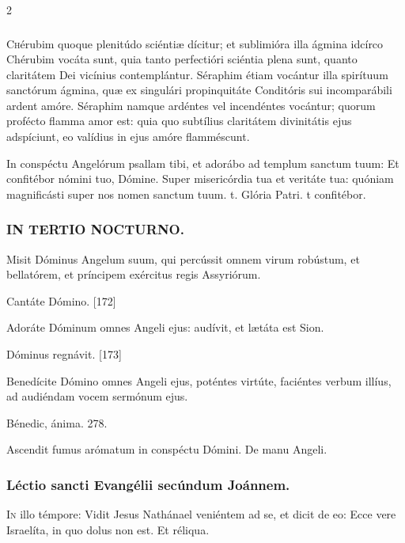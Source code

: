 \documentclass[9pt,twoside]{extarticle}
\begin{document}
\begin{multicols}{2}
\subsubsection*{\center {}}
\lettrine{C}hérubim quoque plenitúdo sciéntiæ dícitur; et sublimióra illa ágmina idcírco Chérubim vocáta sunt, quia tanto perfectióri sciéntia plena sunt, quanto claritátem Dei vicínius contemplántur. Séraphim étiam vocántur illa spirítuum sanctórum ágmina, quæ ex singulári propinquitáte Conditóris sui incomparábili ardent amóre. Séraphim namque ardéntes vel incendéntes vocántur; quorum profécto flamma amor est: quia quo subtílius claritátem divinitátis ejus adspíciunt, eo valídius in ejus amóre flamméscunt.

\begin{tightlist}{}
\item {} In conspéctu Angelórum psallam tibi, et adorábo ad templum sanctum tuum: \textred{*} Et confitébor nómini tuo, Dómine.  Super misericórdia tua et veritáte tua: quóniam magnificásti super nos nomen sanctum tuum. t. Glória Patri. t confitébor.
\end{tightlist}

\subsubsection*{\center \textsc{IN TERTIO NOCTURNO.}}
\begin{tightlist}{}
\item {} Misit Dóminus Angelum suum, qui percússit omnem virum robústum, et bellatórem, et príncipem exércitus regis Assyriórum.
\item {} Cantáte Dómino. [172]
\item {} Adoráte Dóminum omnes Angeli ejus: audívit, et lætáta est Sion.
\item {} Dóminus regnávit. [173]
\item {} Benedícite Dómino omnes Angeli ejus, poténtes virtúte, faciéntes verbum illíus, ad audiéndam vocem sermónum ejus.
\item {} Bénedic, ánima. 278.
\item {} Ascendit fumus arómatum in conspéctu Dómini.  De manu Angeli.
\end{tightlist}

\subsubsection*{\center Léctio sancti Evangélii secúndum Joánnem.}
\begin{center}\end{center}
\lettrine{I}n illo témpore: Vidit Jesus Nathánael veniéntem ad se, et dicit de eo: Ecce vere Israelíta, in quo dolus non est. Et réliqua.


\end{multicols}
\end{document}
